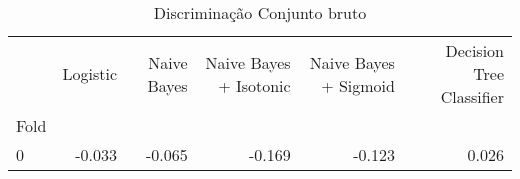 \begin{table}
\centering
\caption{Discriminação Conjunto bruto}
\label{Discriminação Conjunto bruto 6}
\begin{tabular}{lrrrrr}
\toprule
{} &  Logistic &  Naive Bayes &  Naive Bayes + Isotonic &  Naive Bayes + Sigmoid &  Decision Tree Classifier \\
Fold &           &              &                         &                        &                           \\
\midrule
0    &    -0.033 &       -0.065 &                  -0.169 &                 -0.123 &                     0.026 \\
\bottomrule
\end{tabular}
\end{table}
